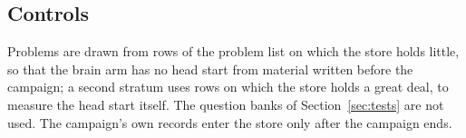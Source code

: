 \subsection{Controls}
Problems are drawn from rows of the problem list on which the store holds little, so that the brain arm has no head start from material written before the campaign; a second stratum uses rows on which the store holds a great deal, to measure the head start itself. The question banks of Section~\ref{sec:tests} are not used. The campaign's own records enter the store only after the campaign ends.

